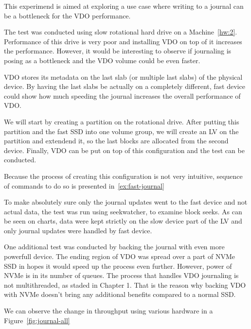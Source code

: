 \documentclass[
  color, %
  table, %
  lof,   %
  lot,   %
]{fithesis3}
\begin{document}
This experimend is aimed at exploring a use case where writing to a journal can be a bottleneck for the VDO performance.

The test was conducted using slow rotational hard drive on a Machine~\ref{hw:2}. Performance of this drive is very poor and installing VDO on top of it increases the performance. However, it would be interesting to observe if journaling is posing as a bottleneck and the VDO volume could be even faster.

VDO stores its metadata on the last slab (or multiple last slabs) of the physical device. By having the last slabs be actually on a completely different, fast device could show how much speeding the journal increases the overall performance of VDO.

We will start by creating a partition on the rotational drive. After putting this partition and the fast SSD into one volume group, we will create an LV on the partition and extendend it, so the last blocks are allocated from the second device. Finally, VDO can be put on top of this configuration and the test can be conducted.

Because the process of creating this configuration is not very intuitive, sequence of commands to do so is presented in~\ref{ex:fast-journal}

To make absolutely sure only the journal updates went to the fast device and not actual data, the test was run using seekwatcher, to examine block seeks. As can be seen on charts, data were kept strictly on the slow device part of the LV and only journal updates were handled by fast device.

One additional test was conducted by backing the journal with even more powerfull device. The ending region of VDO was spread over a part of NVMe SSD in hopes it would speed up the process even further. However, power of NVMe is in its number of queues. The process that handles VDO journaling is not multithreaded, as staded in Chapter 1. That is the reason why backing VDO with NVMe doesn't bring any additional benefits compared to a normal SSD.

We can observe the change in throughput using various hardware in a Figure~\ref{fig:journal-all}

\end{document}
